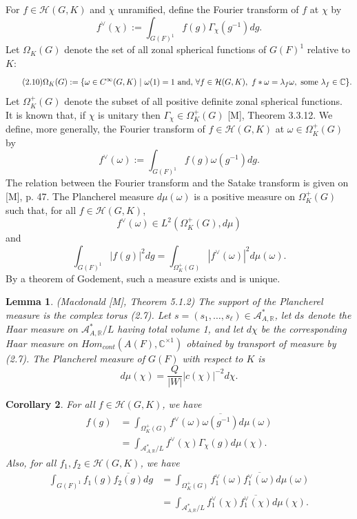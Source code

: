 \documentclass[12pt]{article}
\newtheorem{lemma}{Lemma}[section]
\newtheorem{corollary}[lemma]{Corollary}
\begin{document}
For $f\in\mathcal{H}(G,K)$ and $\chi$ unramified, define the Fourier transform of $f$ at $\chi$ by
\begin{equation}\tag{2.9}
f^\vee(\chi):=\int_{G(F)^1}f(g)\Gamma_\chi(g^{-1})dg.
\end{equation}
Let $\Omega_K(G)$ denote the set of all zonal spherical functions of $G(F)^1$ relative to $K$:
\begin{equation}\tag{2.10}
\Omega_K(G):=\{\omega\in C^\infty(G,K)\ |\ \omega(1)=1\ {\rm and,}\ \forall f\in\mathcal{H}(G,K),\ f*\omega=\lambda_f\omega,\ {\rm some}\ \lambda_f\in\mathbb{C}\}.
\end{equation}
Let $\Omega^+_K(G)$ denote the subset of all positive definite zonal spherical functions. It is known that, if $\chi$ is unitary then $\Gamma_\chi\in\Omega^+_K(G)$ [M], Theorem 3.3.12. We define, more generally, the Fourier transform of $f\in\mathcal{H}(G,K)$ at $\omega\in\Omega_K^+(G)$ by
\begin{equation}\tag{2.11}
f^\vee(\omega):=\int_{G(F)^1}f(g)\omega(g^{-1})dg.
\end{equation}
The relation between the Fourier transform and the Satake transform is given on [M], p. 47. The Plancherel measure $d\mu(\omega)$ is a positive measure on $\Omega^+_K(G)$ such that, for all $f\in\mathcal{H}(G,K)$,
\begin{equation}\tag{2.12}
f^\vee(\omega)\in L^2(\Omega^+_K(G),d\mu)
\end{equation}
and
\begin{equation}\tag{2.13}
\int_{G(F)^1}|f(g)|^2dg=\int_{\Omega^+_K(G)}|f^\vee(\omega)|^2d\mu(\omega).
\end{equation}
By a theorem of Godement, such a measure exists and is unique.

\begin{lemma}
(Macdonald [M], Theorem 5.1.2) The support of the Plancherel measure is the complex torus (2.7). Let $s=(s_1,\dots,s_\ell)\in\mathcal{A}^*_{A,\mathbb{R}}$, let $ds$ denote the Haar measure on $\mathcal{A}^*_{A,\mathbb{R}}/L$ having total volume 1, and let $d\chi$ be the corresponding Haar measure on $Hom_{cont}(A(F),\mathbb{C}^{\times1})$ obtained by transport of measure by (2.7). The Plancherel measure of $G(F)$ with respect to $K$ is
\[
d\mu(\chi)=\frac{Q}{|W|}|c(\chi)|^{-2}d\chi.
\]
\end{lemma}

\begin{corollary}
For all $f\in\mathcal{H}(G,K)$, we have
\[
\begin{array}{rl}
f(g)&=\int_{\Omega^+_K(G)}f^\vee(\omega)\overline{\omega(g^{-1})}d\mu(\omega)\\
&=\int_{\mathcal{A}^*_{A,\mathbb{R}}/L}f^\vee(\chi)\Gamma_\chi(g)d\mu(\chi).
\end{array}
\]
Also, for all $f_1,f_2\in\mathcal{H}(G,K)$, we have
\[
\begin{array}{rl}
\int_{G(F)^1}f_1(g)\overline{f_2(g)}dg&=\int_{\Omega^+_K(G)}f_1^\vee(\omega)\overline{f_1^\vee(\omega)}d\mu(\omega)\\
&=\int_{\mathcal{A}^*_{A,\mathbb{R}}/L}f_1^\vee(\chi)\overline{f_1^\vee(\chi)}d\mu(\chi).
\end{array}
\]
\end{corollary}
\end{document}
